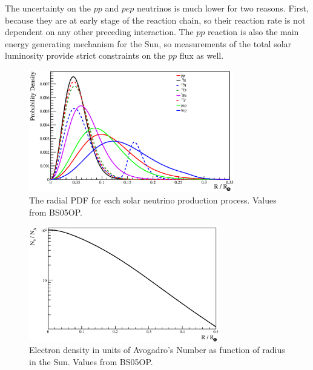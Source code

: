 The uncertainty on the $pp$ and $pep$ neutrinos is much lower for two reasons. First, because
they are at early stage of the reaction chain, so their reaction rate is not dependent on any
other preceding interaction. The $pp$ reaction is also the main energy generating mechanism
for the Sun, so measurements of the total solar luminosity provide strict constraints on the
$pp$ flux as well.

\begin{figure}[htbp]
\centering
\includegraphics[width=0.8\textwidth]{solar_radial_production}
\caption[BS05OP Radial Production Profiles]{The radial
PDF for each solar neutrino production process. Values from BS05OP.}
\label{fig:radial_production_pdfs}
\end{figure}

\begin{figure}[htbp]
\centering
\includegraphics[width=0.74\textwidth]{solar_electron_density}
\caption[BS05OP Electron Density]{Electron density in units of Avogadro's
Number as function of radius in the Sun. Values from BS05OP.}
\label{fig:electron_density}
\end{figure}

